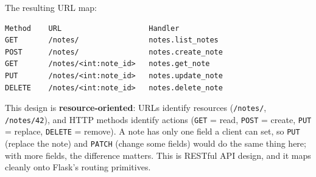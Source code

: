 \begin{codebox}[short]

\begin{Shaded}
\begin{Highlighting}[]
\OperatorTok{=}\NormalTok{)}
\end{Highlighting}
\end{Shaded}

\end{codebox}

\noindent{}The resulting URL map:

\begin{outputbox}[short]
\begin{Verbatim}[fontsize=\codesize, breaklines, breakanywhere, breaksymbolleft={\tiny\textcolor{muted}{$\hookrightarrow$}}]
Method    URL                    Handler
GET       /notes/                notes.list_notes
POST      /notes/                notes.create_note
GET       /notes/<int:note_id>   notes.get_note
PUT       /notes/<int:note_id>   notes.update_note
DELETE    /notes/<int:note_id>   notes.delete_note
\end{Verbatim}
\end{outputbox}

\noindent{}This design is \textbf{resource-oriented}: URLs identify resources (\texttt{/notes/}, \texttt{/notes/42}), and HTTP methods identify actions (\texttt{GET} = read, \texttt{POST} = create, \texttt{PUT} = replace, \texttt{DELETE} = remove). A note has only one field a client can set, so \texttt{PUT} (replace the note) and \texttt{PATCH} (change some fields) would do the same thing here; with more fields, the difference matters. This is RESTful API design, and it maps cleanly onto Flask's routing primitives.


